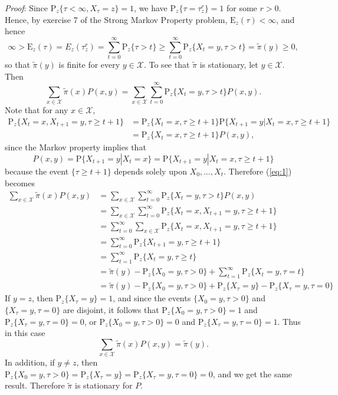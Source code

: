 \documentclass[12pt]{article}
\newcommand{\E}{\mathrm{E}}
\newcommand{\Prob}{\mathrm{P}}
\begin{document}
\textit{Proof}: Since $\Prob_z\{\tau < \infty, X_\tau = z\} = 1$, we have $\Prob_z\{\tau = \tau_z^r\} = 1$ for some $r > 0$. Hence, by exercise 7 of the Strong Markov Property problem, $\E_z(\tau) < \infty$, and hence
\begin{equation*}
\infty > \E_z(\tau) = E_z(\tau_z^r) = \sum_{t=0}^\infty \Prob_z\{\tau > t\} \geq \sum_{t=0}^\infty \Prob_z\{X_t = y, \tau > t\} = \tilde{\pi}(y) \geq 0,
\end{equation*}
so that $\tilde{\pi}(y)$ is finite for every $y \in \mathcal{X}$. To see that $\tilde{\pi}$ is stationary, let $y \in \mathcal{X}$. Then
\begin{equation} \label{eq:1}
\sum_{x \in \mathcal{X}} \tilde{\pi}(x) P(x, y) = \sum_{x \in \mathcal{X}} \sum_{t=0}^\infty \Prob_z\{X_t = y, \tau > t\} P(x, y).
\end{equation}
Note that for any $x \in \mathcal{X}$,
\begin{align*}
\Prob_z\{X_t = x, X_{t+1} = y, \tau \geq t + 1\} &= \Prob_z\{X_t = x, \tau \geq t+1\} \Prob\{X_{t+1} = y | X_t = x, \tau \geq t+1\} \\
&= \Prob_z\{X_t = x, \tau \geq t+1\} P(x, y),
\end{align*}
since the Markov property implies that
\begin{equation*}
P(x, y) = \Prob\{X_{t+1} = y | X_t = x\} = \Prob\{X_{t+1} = y | X_t = x, \tau \geq t+1\}
\end{equation*}
because the event $\{\tau \geq t+1\}$ depends solely upon $X_0, \ldots, X_t$. Therefore (\ref{eq:1}) becomes
\begin{align*}
\sum_{x \in \mathcal{X}} \tilde{\pi}(x) P(x, y) &= \sum_{x \in \mathcal{X}} \sum_{t=0}^\infty \Prob_z\{X_t = y, \tau > t\} P(x, y) \\
&= \sum_{x \in \mathcal{X}} \sum_{t=0}^\infty \Prob_z\{X_t = x, X_{t+1} = y, \tau \geq t + 1\} \\
&= \sum_{t=0}^\infty \sum_{x \in \mathcal{X}} \Prob_z\{X_t = x, X_{t+1} = y, \tau \geq t + 1\} \\
&= \sum_{t=0}^\infty \Prob_z\{X_{t+1} = y, \tau \geq t + 1\} \\
&= \sum_{t=1}^\infty \Prob_z\{X_t = y, \tau \geq t\} \\
&= \tilde{\pi}(y) - \Prob_z\{X_0 = y, \tau > 0\} + \sum_{t=1}^\infty \Prob_z\{X_t = y, \tau = t\} \\
&= \tilde{\pi}(y) - \Prob_z\{X_0 = y, \tau > 0\} + \Prob_z\{X_\tau = y\} - \Prob_z\{X_\tau = y, \tau = 0\}
\end{align*}
If $y = z$, then $\Prob_z\{X_\tau = y\} = 1$, and since the events $\{X_0 = y, \tau > 0\}$ and $\{X_\tau = y, \tau = 0\}$ are disjoint, it follows that $\Prob_z\{X_0 = y, \tau > 0\} = 1$ and $\Prob_z\{X_\tau = y, \tau = 0\} = 0$, or $\Prob_z\{X_0 = y, \tau > 0\} = 0$ and $\Prob_z\{X_\tau = y, \tau = 0\} = 1$. Thus in this case
\begin{equation*}
\sum_{x \in \mathcal{X}} \tilde{\pi}(x) P(x, y) = \tilde{\pi}(y).
\end{equation*}
In addition, if $y \neq z$, then $\Prob_z\{X_0 = y, \tau > 0\} = \Prob_z\{X_\tau = y\} = \Prob_z\{X_\tau = y, \tau = 0\} = 0$, and we get the same result. Therefore $\tilde{\pi}$ is stationary for $P$.
\end{document}
